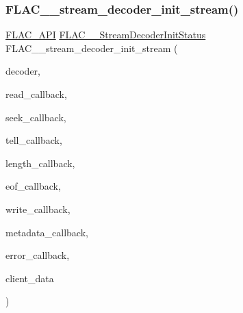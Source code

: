 \subsubsection{\texorpdfstring{FLAC\_\_stream\_decoder\_init\_stream()}{FLAC\_\_stream\_decoder\_init\_stream()}}
{\footnotesize\ttfamily \mbox{\hyperlink{group__flac__export_ga56ca07df8a23310707732b1c0007d6f5}{F\+L\+A\+C\+\_\+\+A\+PI}} \mbox{\hyperlink{group__flac__stream__decoder_gaaed54a24ac6310d29c5cafba79759c44}{F\+L\+A\+C\+\_\+\+\_\+\+Stream\+Decoder\+Init\+Status}} F\+L\+A\+C\+\_\+\+\_\+stream\+\_\+decoder\+\_\+init\+\_\+stream (\begin{DoxyParamCaption}\item[{\mbox{\hyperlink{struct_f_l_a_c_____stream_decoder}{F\+L\+A\+C\+\_\+\+\_\+\+Stream\+Decoder}} $\ast$}]{decoder,  }\item[{\mbox{\hyperlink{group__flac__stream__decoder_ga25d4321dc2f122d35ddc9061f44beae7}{F\+L\+A\+C\+\_\+\+\_\+\+Stream\+Decoder\+Read\+Callback}}}]{read\+\_\+callback,  }\item[{\mbox{\hyperlink{group__flac__stream__decoder_ga4c18b0216e0f7a83d7e4e7001230545d}{F\+L\+A\+C\+\_\+\+\_\+\+Stream\+Decoder\+Seek\+Callback}}}]{seek\+\_\+callback,  }\item[{\mbox{\hyperlink{group__flac__stream__decoder_gafdf1852486617a40c285c0d76d451a5a}{F\+L\+A\+C\+\_\+\+\_\+\+Stream\+Decoder\+Tell\+Callback}}}]{tell\+\_\+callback,  }\item[{\mbox{\hyperlink{group__flac__stream__decoder_ga5363f3b46e3f7d6a73385f6560f7e7ef}{F\+L\+A\+C\+\_\+\+\_\+\+Stream\+Decoder\+Length\+Callback}}}]{length\+\_\+callback,  }\item[{\mbox{\hyperlink{group__flac__stream__decoder_ga4eac094fc609363532d90cf8374b4f7e}{F\+L\+A\+C\+\_\+\+\_\+\+Stream\+Decoder\+Eof\+Callback}}}]{eof\+\_\+callback,  }\item[{\mbox{\hyperlink{group__flac__stream__decoder_ga61e48dc2c0d2f6c5519290ff046874a4}{F\+L\+A\+C\+\_\+\+\_\+\+Stream\+Decoder\+Write\+Callback}}}]{write\+\_\+callback,  }\item[{\mbox{\hyperlink{group__flac__stream__decoder_ga6aa87c01744c1c601b7f371f627b6e14}{F\+L\+A\+C\+\_\+\+\_\+\+Stream\+Decoder\+Metadata\+Callback}}}]{metadata\+\_\+callback,  }\item[{\mbox{\hyperlink{group__flac__stream__decoder_gac896ee6a12668e9015fab4fbc6aae996}{F\+L\+A\+C\+\_\+\+\_\+\+Stream\+Decoder\+Error\+Callback}}}]{error\+\_\+callback,  }\item[{\mbox{\hyperlink{_s_d_l__opengles2__gl2ext_8h_ae5d8fa23ad07c48bb609509eae494c95}{void}} $\ast$}]{client\+\_\+data }\end{DoxyParamCaption})}

